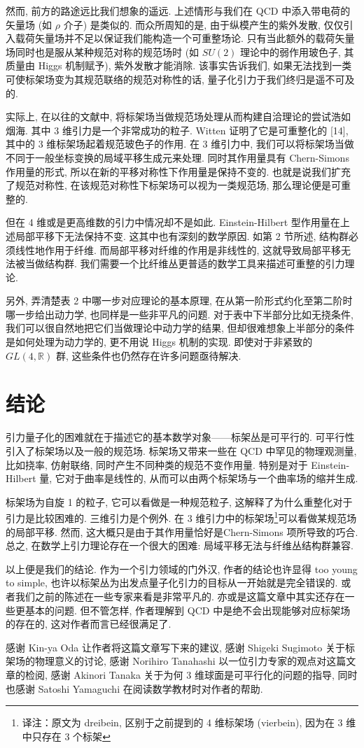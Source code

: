 \documentclass{article}
\begin{document}
然而, 前方的路途远比我们想象的遥远. 上述情形与我们在 QCD 中添入带电荷的矢量场 (如 $\rho$ 介子) 是类似的. 而众所周知的是, 由于纵模产生的紫外发散, 仅仅引入载荷矢量场并不足以保证我们能构造一个可重整场论. 只有当此额外的载荷矢量场同时也是服从某种规范对称的规范场时 (如 $SU(2)$ 理论中的弱作用玻色子, 其质量由 Higgs 机制赋予), 紫外发散才能消除. 该事实告诉我们, 如果无法找到一类可使标架场变为其规范联络的规范对称性的话, 量子化引力于我们终归是遥不可及的.

实际上, 在以往的文献中, 将标架场当做规范场处理从而构建自洽理论的尝试浩如烟海. 其中 3 维引力是一个非常成功的粒子. Witten 证明了它是可重整化的 [14], 其中的 3 维标架场起着规范玻色子的作用. 在 3 维引力中, 我们可以将标架场当做不同于一般坐标变换的局域平移生成元来处理. 同时其作用量具有 Chern-Simons 作用量的形式, 所以在新的平移对称性下作用量是保持不变的. 也就是说我们扩充了规范对称性, 在该规范对称性下标架场可以视为一类规范场, 那么理论便是可重整的.

但在 4 维或是更高维数的引力中情况却不是如此. Einstein-Hilbert 型作用量在上述局部平移下无法保持不变. 这其中也有深刻的数学原因. 如第 2 节所述, 结构群必须线性地作用于纤维. 而局部平移对纤维的作用是非线性的, 这就导致局部平移无法被当做结构群. 我们需要一个比纤维丛更普适的数学工具来描述可重整的引力理论.

另外, 弄清楚表 2 中哪一步对应理论的基本原理, 在从第一阶形式约化至第二阶时哪一步给出动力学, 也同样是一些非平凡的问题. 对于表中下半部分比如无挠条件, 我们可以很自然地把它们当做理论中动力学的结果, 但却很难想象上半部分的条件是如何处理为动力学的, 更不用说 Higgs 机制的实现. 即使对于非紧致的 $GL(4,\mathbb{R})$ 群, 这些条件也仍然存在许多问题亟待解决.
\section{结论}
引力量子化的困难就在于描述它的基本数学对象——标架丛是可平行的. 可平行性引入了标架场以及一般的规范场. 标架场又带来一些在 QCD 中罕见的物理观测量, 比如挠率, 仿射联络, 同时产生不同种类的规范不变作用量. 特别是对于 Einstein-Hilbert 量, 它对于曲率是线性的, 从而可以由两个标架场与一个曲率场的缩并生成.

标架场为自旋 1 的粒子, 它可以看做是一种规范粒子, 这解释了为什么重整化对于引力是比较困难的. 三维引力是个例外. 在 3 维引力中的标架场\footnote{译注：原文为 dreibein, 区别于之前提到的 4 维标架场 (vierbein), 因为在 3 维中只存在 3 个标架}可以看做某规范场的局部平移. 然而, 这大概只是由于其作用量恰好是Chern-Simons 项所导致的巧合. 总之, 在数学上引力理论存在一个很大的困难: 局域平移无法与纤维丛结构群兼容.

以上便是我们的结论. 作为一个引力领域的门外汉, 作者的结论也许显得 too young to simple, 也许以标架丛为出发点量子化引力的目标从一开始就是完全错误的. 或者我们之前的陈述在一些专家来看是非常平凡的. 亦或是这篇文章中其实还存在一些更基本的问题. 但不管怎样, 作者理解到 QCD 中是绝不会出现能够对应标架场的存在的, 这对作者而言已经很满足了.

感谢 Kin-ya Oda 让作者将这篇文章写下来的建议, 感谢 Shigeki Sugimoto 关于标架场的物理意义的讨论, 感谢 Norihiro Tanahashi 以一位引力专家的观点对这篇文章的检阅, 感谢 Akinori Tanaka 关于为何 3 维球面是可平行化的问题的指导, 同时也感谢 Satoshi Yamaguchi 在阅读数学教材时对作者的帮助.
\end{document}
